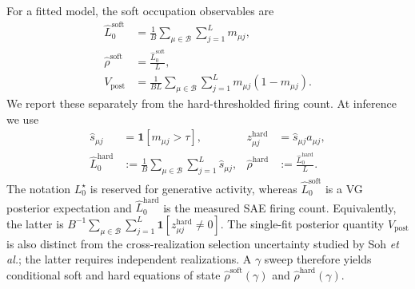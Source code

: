 \documentclass[aps,pre,reprint,superscriptaddress,amsmath,amssymb,nofootinbib]{revtex4-2}
\begin{document}
For a fitted model, the soft occupation observables are
\begin{align}
 \widehat L_0^{\mathrm{soft}}
 &=\frac1B\sum_{\mu\in\mathcal B}\sum_{j=1}^{L}m_{\mu j},\\
 \widehat\rho^{\mathrm{soft}}
 &=\frac{\widehat L_0^{\mathrm{soft}}}{L},\\
 V_{\mathrm{post}}&=\frac1{BL}
 \sum_{\mu\in\mathcal B}\sum_{j=1}^{L}m_{\mu j}(1-m_{\mu j}).
 \label{eq:observables}
\end{align}
We report these separately from the hard-thresholded firing count.  At
inference we use
\begin{align}
 \widehat s_{\mu j}&=\mathbf 1[m_{\mu j}>\tau],
 &z^{\mathrm{hard}}_{\mu j}&=\widehat s_{\mu j}a_{\mu j},\\
 \widehat L_0^{\mathrm{hard}}
 &:=\frac1B\sum_{\mu\in\mathcal B}\sum_{j=1}^{L}\widehat s_{\mu j},
 &\widehat\rho^{\mathrm{hard}}
 &:=\frac{\widehat L_0^{\mathrm{hard}}}{L}.
 \label{eq:hard-code}
\end{align}
The notation $L_0^\star$ is reserved for generative activity, whereas
$\widehat L_0^{\mathrm{soft}}$ is a VG posterior expectation and
$\widehat L_0^{\mathrm{hard}}$ is the measured SAE firing count.  Equivalently,
the latter is $B^{-1}\sum_{\mu\in\mathcal B}\sum_{j=1}^{L}
\mathbf 1[z^{\mathrm{hard}}_{\mu j}\ne0]$.  The
single-fit posterior quantity $V_{\mathrm{post}}$ is also distinct from the
cross-realization selection uncertainty studied by Soh \emph{et al.}; the
latter requires independent realizations.  A $\gamma$ sweep
therefore yields conditional soft and hard equations of state
$\widehat\rho^{\mathrm{soft}}(\gamma)$ and
$\widehat\rho^{\mathrm{hard}}(\gamma)$.
\end{document}
